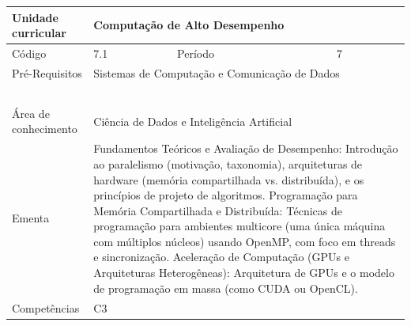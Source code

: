 \clearpage
\newpage

\begin{quadro}[ht!]
  \centering\scriptsize
\caption{Unidade Curricular Computação de Alto Desempenho}

\begin{tabular}{|p{2.5cm}|p{2.5cm}|p{2.5cm}|p{2.5cm}|p{2.5cm}|}\hline

  Unidade curricular & \multicolumn{4}{p{10cm}|}{ Computação de Alto Desempenho }\\\hline
  Código & 7.1 & Período & \multicolumn{2}{p{5cm}|}{ 7 }\\\hline
  Pré-Requisitos & \multicolumn{4}{p{10cm}|}{ Sistemas de Computação e Comunicação de Dados } \\\hline
  \cellcolor{blue1}{ CH PRESENCIAL } &
    \cellcolor{blue1}{CH EAD Síncrona} &
    \cellcolor{blue1}{CH EAD Síncrona Mediada} &
    \cellcolor{blue1}{CH EAD Assíncrona} &
    \cellcolor{blue1}{CH APCC} \\\hline
  \cellcolor{blue1}{ 60 } &
    \cellcolor{blue1}{ 0 } &
    \cellcolor{blue1}{ 0 } &
    \cellcolor{blue1}{ 0 } &
    \cellcolor{blue1}{0} \\\hline
  \cellcolor{blue1}{ CH Teórica } &
    \cellcolor{blue1}{CH Prática} &
    \cellcolor{blue1}{CH Humanidades} &
    \cellcolor{blue1}{CH Extensão} &
    \cellcolor{blue1}{CH EAD TOTAL} \\\hline
  \cellcolor{blue1}{ 30 } &
    \cellcolor{blue1}{ 30 } &
    \cellcolor{blue1}{ 0 } &
    \cellcolor{blue1}{ 0 } &
    \cellcolor{blue1}{ 0 } \\\hline
  \cellcolor{blue1}{CARGA-HORÁRIA TOTAL} & \multicolumn{4}{p{10cm}|}{ \cellcolor{blue1}{ 60 } } \\\hline
  Área de conhecimento & \multicolumn{4}{p{10cm}|}{ Ciência de Dados e Inteligência Artificial } \\\hline
  Ementa & \multicolumn{4}{p{10cm}|}{ Fundamentos Teóricos e Avaliação de Desempenho: Introdução ao paralelismo (motivação, taxonomia), arquiteturas de hardware (memória compartilhada vs. distribuída), e os princípios de projeto de algoritmos. Programação para Memória Compartilhada e Distribuída: Técnicas de programação para ambientes multicore (uma única máquina com múltiplos núcleos) usando OpenMP, com foco em threads e sincronização. Aceleração de Computação (GPUs e Arquiteturas Heterogêneas): Arquitetura de GPUs e o modelo de programação em massa (como CUDA ou OpenCL). } \\\hline
  Competências & \multicolumn{4}{p{10cm}|}{ C3 } \\\hline


  
	\end{tabular}

\end{quadro}


